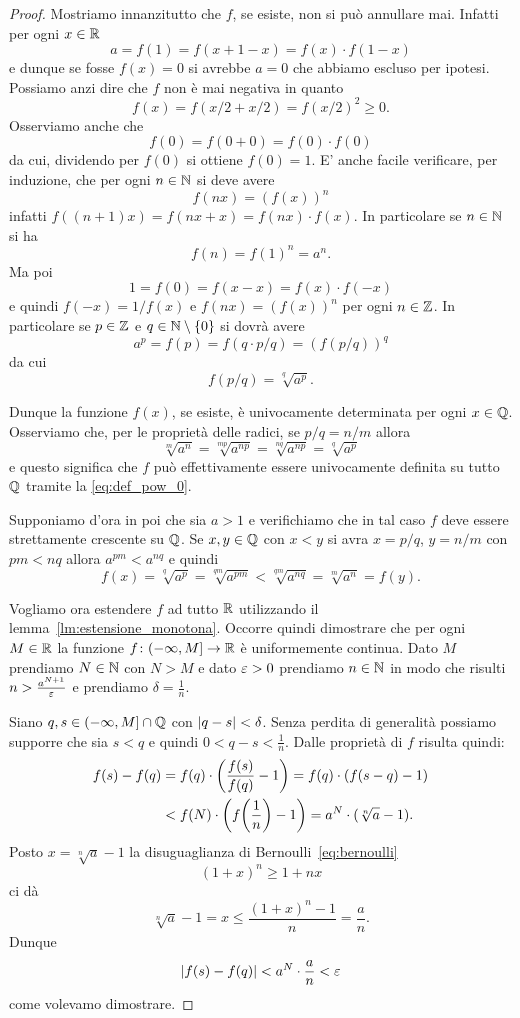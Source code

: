 \begin{proof}
Mostriamo innanzitutto che $f$, se esiste,
non si può annullare mai.
Infatti per ogni $x\in \mathbb R$
\[
   a = f(1) = f(x+1-x) = f(x)\cdot f(1-x)
\]
e dunque se fosse $f(x)=0$ si avrebbe $a=0$ che abbiamo escluso per ipotesi.
Possiamo anzi dire che $f$ non è mai negativa in quanto
\[
  f(x) = f(x/2 + x/2) = f(x/2)^2 \ge 0.
\]
Osserviamo anche che
\[
  f(0) = f(0+0) = f(0)\cdot f(0)
\]
da cui, dividendo per $f(0)$ si ottiene $f(0)=1$.
E' anche facile verificare, per induzione, che
per ogni $n\in \mathbb N$ si deve avere
\[
 f(nx) = (f(x))^n
\]
infatti $f((n+1)x) = f(nx+x)=f(nx)\cdot f(x)$.
In particolare se $n\in \mathbb N$ si ha
\[
  f(n) = f(1)^n = a^n.
\]
Ma poi
\[
1=f(0) = f(x-x) = f(x)\cdot f(-x)
\]
e quindi $f(-x)=1/f(x)$ e $f(nx) = (f(x))^n$ per ogni $n\in \mathbb Z$.
In particolare se $p\in \mathbb Z$ e $q \in \mathbb N\setminus{\left\{ 0 \right\}}$
si dovrà avere
\[
 a^p = f(p) = f(q\cdot p/q) = (f(p/q))^q
\]
da cui
\begin{equation}\label{eq:def_pow_0}
 f(p/q) = \sqrt[q]{a^p}.
\end{equation}

Dunque la funzione $f(x)$, se esiste, è univocamente determinata
per ogni $x\in \mathbb Q$.
Osserviamo che, per le proprietà delle radici, se $p/q = n/m$ allora
\[
 \sqrt[m]{a^n}
 = \sqrt[mp]{a^{np}}
 = \sqrt[nq]{a^{np}}
 = \sqrt[q]{a^p}
\]
e questo significa che $f$ può effettivamente essere univocamente
definita su tutto $\mathbb Q$ tramite
la \eqref{eq:def_pow_0}.

Supponiamo d'ora in poi che sia $a>1$
e verifichiamo che in tal caso $f$ deve essere strettamente
crescente su $\mathbb Q$.
Se $x,y \in \mathbb Q$
con $x<y$ si avra $x=p/q$, $y=n/m$ con $pm < nq$ allora
$a^{pm} < a^{nq}$ e quindi
\[
f(x)
= \sqrt[q]{a^p}
= \sqrt[qm]{a^{pm}}
< \sqrt[qm]{a^{nq}}
= \sqrt[m]{a^n}
= f(y).
\]

Vogliamo ora estendere $f$ ad tutto $\mathbb R$
utilizzando il lemma~\ref{lm:estensione_monotona}.
Occorre quindi dimostrare che per ogni $M\in \mathbb R$
la funzione $f\colon(-\infty,M]\to \mathbb R$ è
uniformemente continua.
Dato $M$ prendiamo $N\in \mathbb N$ con $N>M$
e dato $\varepsilon>0$ prendiamo $n\in \mathbb N$
in modo che risulti $n> \frac{a^{N+1}}{\varepsilon}$
e prendiamo $\delta = \frac 1 n$.

Siano $q,s \in (-\infty,M]\cap \mathbb Q$
 con ${\left|q-s\right|}<\delta$.
 Senza perdita di generalità
 possiamo supporre che sia $s<q$
 e quindi $0<q-s<\frac{1}{n}$.
Dalle proprietà di $f$
 risulta quindi:
\begin{align*}
f(s) - f(q)
&= f(q)\cdot{\left( \frac{f(s)}{f(q)}-1 \right)}
= f(q)\cdot{\left( f(s-q)-1 \right)}\\
&< f(N)\cdot{\left( f{\left( \frac 1 n \right)}-1 \right)}
= a^N\cdot(\sqrt[n]{a}-1).
\end{align*}
Posto $x=\sqrt[n]{a}-1$
la disuguaglianza di Bernoulli~\eqref{eq:bernoulli}
\[
  (1+x)^n \ge 1 + nx
\]
ci dà
\[
  \sqrt[n]{a}-1 = x
  \le \frac{(1+x)^n-1}{n}
  = \frac{a}{n}.
\]
Dunque
\[
{\left|f(s)-f(q)\right|} < a^N \cdot \frac{a}{n} < \varepsilon
\]
come volevamo dimostrare.


\end{proof}
